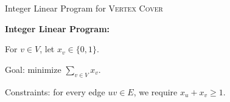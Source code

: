 \documentclass[english]{spicker}
\begin{document}
\begin{example}{Integer Linear Program for \textsc{Vertex Cover}}

    \textbf{Integer Linear Program:}

    For $v\in V$, let $x_v \in \{0, 1\}$.

    Goal: minimize $\sum_{v\in V}x_v$.

    Constraints: for every edge $uv \in E$, we require $x_u + x_v \geq 1$.
\end{example}

\printbibliography
\end{document}
